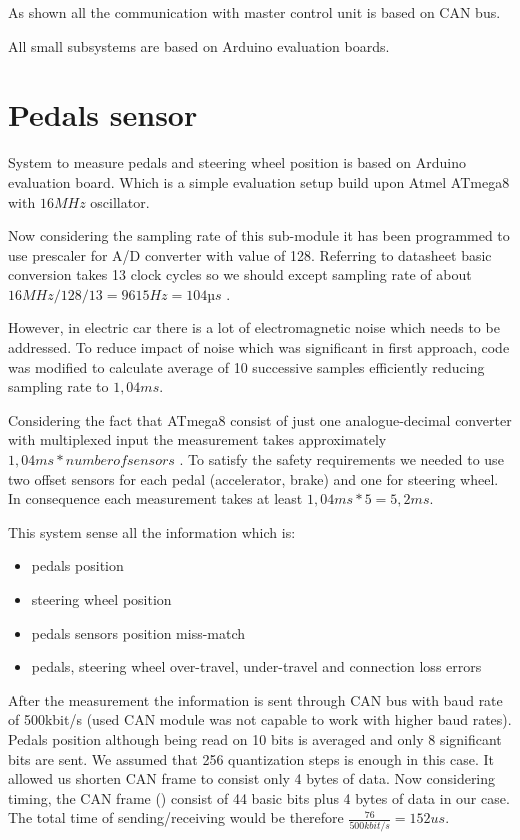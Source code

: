 As shown all the communication with master control unit is based on CAN bus. 






All small subsystems are based on Arduino evaluation boards.


\section{Pedals sensor}
System to measure pedals and steering wheel position is based on Arduino evaluation board. Which is a simple evaluation setup build upon Atmel ATmega8 with $16MHz$ oscillator.

Now considering the sampling rate of this sub-module it has been programmed to use prescaler for A/D converter with value of 128. Referring to datasheet basic conversion takes 13 clock cycles so we should except sampling rate of about $16MHz/128/13 = 9615Hz = 104µs$ \cite{Atmega8}.

However, in electric car there is a lot of electromagnetic noise which needs to be addressed. To reduce impact of noise which was significant in first approach, code was modified to calculate average of 10 successive samples efficiently reducing sampling rate to $1,04ms$.

Considering the fact that ATmega8 consist of just one analogue-decimal converter with multiplexed input the measurement takes approximately $1,04ms * number of sensors$ \cite{Atmega8}.
To satisfy the safety requirements we needed to use two offset sensors for each pedal (accelerator, brake) and one for steering wheel. In consequence each measurement takes at least $1,04ms * 5 = 5,2ms$.

This system sense all the information which is:
\begin{itemize}
    \item pedals position
    \item steering wheel position
    \item pedals sensors position miss-match
    \item pedals, steering wheel over-travel, under-travel and connection loss errors
\end{itemize}

After the measurement the information is sent through CAN bus with baud rate of 500kbit/s (used CAN module was not capable to work with higher baud rates). Pedals position although being read on 10 bits is averaged and only 8 significant bits are sent. We assumed that 256 quantization steps is enough in this case. It allowed us shorten CAN frame to consist only 4 bytes of data.
Now considering timing, the CAN frame () consist of 44 basic bits plus 4 bytes of data in our case. The total time of sending/receiving would be therefore $\frac{76}{500kbit/s} = 152us$.

